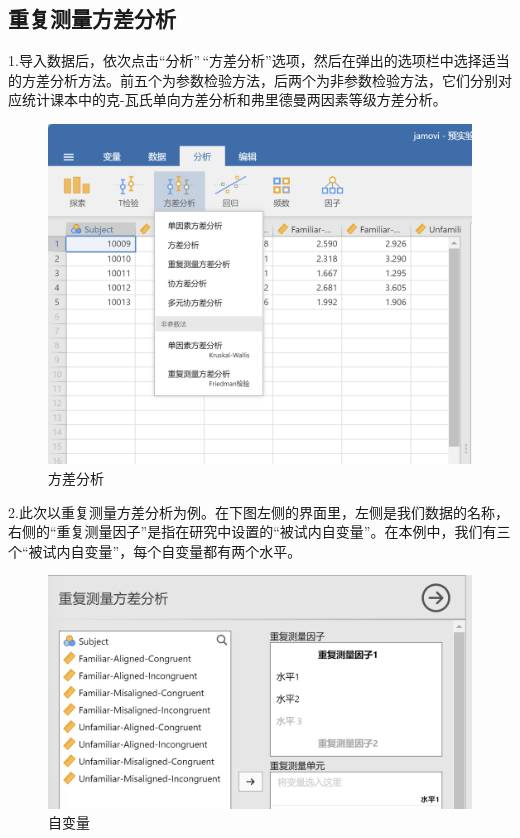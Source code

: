 \documentclass[]{ctexbook}
\theoremstyle{definition}
\theoremstyle{definition}
\theoremstyle{definition}
\theoremstyle{definition}
\theoremstyle{remark}
\begin{document}
\subsection{重复测量方差分析}\label{ux91cdux590dux6d4bux91cfux65b9ux5deeux5206ux6790}

1.导入数据后，依次点击``分析''\,``方差分析''选项，然后在弹出的选项栏中选择适当的方差分析方法。前五个为参数检验方法，后两个为非参数检验方法，它们分别对应统计课本中的克-瓦氏单向方差分析和弗里德曼两因素等级方差分析。

\begin{figure}

{\centering \includegraphics[width=0.8\linewidth]{img/jamovi/anova} 

}

\caption{方差分析}\label{fig:jamovi-anova}
\end{figure}

2.此次以重复测量方差分析为例。在下图左侧的界面里，左侧是我们数据的名称，右侧的``重复测量因子''是指在研究中设置的``被试内自变量''。在本例中，我们有三个``被试内自变量''，每个自变量都有两个水平。

\begin{figure}

{\centering \includegraphics[width=0.6\linewidth]{img/jamovi/rmanova-factor} 

}

\caption{自变量}\label{fig:jamovi-rmanova-factor}
\end{figure}
\end{document}

